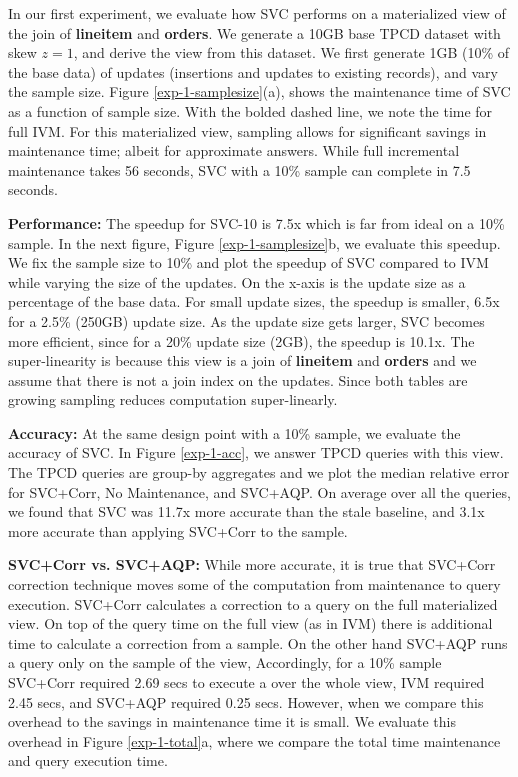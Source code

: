 In our first experiment, we evaluate how SVC performs on a materialized view of the join of \textbf{lineitem} and \textbf{orders}.
We generate a 10GB base TPCD dataset with skew $z=1$, and derive the view from this dataset.
We first generate 1GB (10\% of the base data) of updates (insertions and updates to existing records), and vary the sample size.
Figure \ref{exp-1-samplesize}(a), shows the maintenance time of SVC as a function of sample size.
With the bolded dashed line, we note the time for full IVM. 
For this materialized view, sampling allows for significant savings in maintenance time; albeit for approximate answers.
While full incremental maintenance takes 56 seconds, SVC with a 10\% sample can complete in 7.5 seconds.

\textbf{Performance: }
The speedup for SVC-10 is 7.5x which is far from ideal on a 10\% sample.
In the next figure, Figure \ref{exp-1-samplesize}b, we evaluate this speedup. 
We fix the sample size to 10\% and plot the speedup of SVC compared to IVM while varying the size of the updates.
On the x-axis is the update size as a percentage of the base data.
For small update sizes, the speedup is smaller, 6.5x for a 2.5\% (250GB) update size.
As the update size gets larger, SVC becomes more efficient, since for a 20\% update size (2GB), the speedup is 10.1x. 
The super-linearity is because this view is a join of \textbf{lineitem} and \textbf{orders} and we assume that there is not a join index on the updates.
Since both tables are growing sampling reduces computation super-linearly. 

\textbf{Accuracy: }
At the same design point with a 10\% sample, we evaluate the accuracy of SVC.
In Figure \ref{exp-1-acc}, we answer TPCD queries with this view.
The TPCD queries are group-by aggregates and we plot the median relative error for SVC+Corr, No Maintenance, and SVC+AQP.
On average over all the queries, we found that SVC was 11.7x more accurate than the stale baseline, and 3.1x more accurate than applying SVC+Corr to the sample.

\textbf{SVC+Corr vs. SVC+AQP: }
While more accurate, it is true that SVC+Corr correction technique moves some of the computation from maintenance to query execution.
SVC+Corr calculates a correction to a query on the full materialized view.
On top of the query time on the full view (as in IVM) there is additional time to calculate a correction from a sample.
On the other hand SVC+AQP runs a query only on the sample of the view, 
Accordingly, for a 10\% sample SVC+Corr required 2.69 secs to execute a \sumfunc over the whole view, IVM required 2.45 secs, and  SVC+AQP required 0.25 secs.
However, when we compare this overhead to the savings in maintenance time it is small.
We evaluate this overhead in Figure \ref{exp-1-total}a, where we compare the total time maintenance and query execution time.

